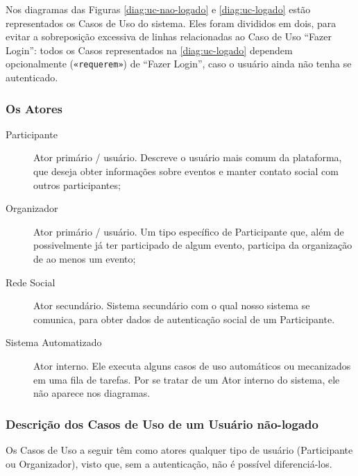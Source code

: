 \documentclass[12pt,a4paper,twoside,hyphens,english,brazil]{abntex2}
\begin{document}
{Nos diagramas das Figuras \ref{diag:uc-nao-logado} e \ref{diag:uc-logado} estão representados os Casos de Uso do sistema. Eles foram divididos em dois, para evitar a sobreposição excessiva de linhas relacionadas ao Caso de Uso ``Fazer Login'': todos os Casos representados na \autoref{diag:uc-logado} dependem opcionalmente (\texttt{«requerem»}) de ``Fazer Login'', caso o usuário ainda não tenha se autenticado.

\subsubsection{Os Atores}
\begin{description}
	\item[Participante] Ator primário / usuário. Descreve o usuário mais comum da plataforma, que deseja obter informações sobre eventos e manter contato social com outros participantes;
	\item[Organizador] Ator primário / usuário. Um tipo específico de Participante que, além de possivelmente já ter participado de algum evento, participa da organização de ao menos um evento;
	\item[Rede Social] Ator secundário. Sistema secundário com o qual nosso sistema se comunica, para obter dados de autenticação social de um Participante.
	\item[Sistema Automatizado] Ator interno. Ele executa alguns casos de uso automáticos ou mecanizados em uma fila de tarefas. Por se tratar de um Ator interno do sistema, ele não aparece nos diagramas.
\end{description}

\subsubsection{Descrição dos Casos de Uso de um Usuário não-logado}
Os Casos de Uso a seguir têm como atores qualquer tipo de usuário (Participante ou Organizador), visto que, sem a autenticação, não é possível diferenciá-los.

}
\end{document}
